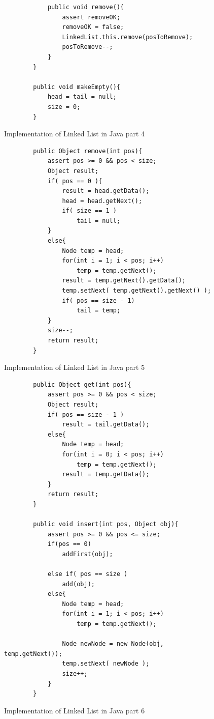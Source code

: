 \begin{figure}[H]
	\begin{lstlisting}
	        public void remove(){
	            assert removeOK;
	            removeOK = false;
	            LinkedList.this.remove(posToRemove);
	            posToRemove--;
	        }
	    }
	    
	    public void makeEmpty(){
	        head = tail = null;
	        size = 0;
	    }
	\end{lstlisting}
	\caption{Implementation of Linked List in Java part 4}
	\label{fig26}
\end{figure}
\begin{figure}[H]
	\begin{lstlisting}
	    public Object remove(int pos){
	        assert pos >= 0 && pos < size;
	        Object result;
	        if( pos == 0 ){
	            result = head.getData();
	            head = head.getNext();
	            if( size == 1 )
	                tail = null;
	        }
	        else{    
	            Node temp = head;
	            for(int i = 1; i < pos; i++)
	                temp = temp.getNext();
	            result = temp.getNext().getData();
	            temp.setNext( temp.getNext().getNext() );
	            if( pos == size - 1)
	                tail = temp;
	        }
	        size--;
	        return result;
	    }
	\end{lstlisting}
	\caption{Implementation of Linked List in Java part 5}
	\label{fig27}
\end{figure}
\begin{figure}[H]
	\begin{lstlisting}
	    public Object get(int pos){
	        assert pos >= 0 && pos < size;
	        Object result;
	        if( pos == size - 1 )
	            result = tail.getData();
	        else{
	            Node temp = head;
	            for(int i = 0; i < pos; i++)
	                temp = temp.getNext();
	            result = temp.getData();
	        }
	        return result;
	    }
	    
	    public void insert(int pos, Object obj){
	        assert pos >= 0 && pos <= size;
	        if(pos == 0)
	            addFirst(obj);
	
	        else if( pos == size )
	            add(obj);
	        else{
	            Node temp = head;
	            for(int i = 1; i < pos; i++)
	                temp = temp.getNext();
	
	            Node newNode = new Node(obj, temp.getNext());
	            temp.setNext( newNode );
	            size++;
	        }
	    }
	\end{lstlisting}
	\caption{Implementation of Linked List in Java part 6}
	\label{fig28}
\end{figure}
